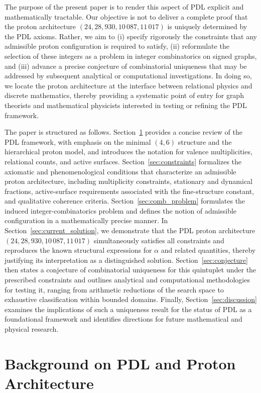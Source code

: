 \documentclass[11pt,a4paper]{article}
\begin{document}
The purpose of the present paper is to render this aspect of PDL explicit and mathematically tractable. Our objective is not to deliver a complete proof that the proton architecture $(24,28,930,10\,087,11\,017)$ is uniquely determined by the PDL axioms. Rather, we aim to (i) specify rigorously the constraints that any admissible proton configuration is required to satisfy, (ii) reformulate the selection of these integers as a problem in integer combinatorics on signed graphs, and (iii) advance a precise conjecture of combinatorial uniqueness that may be addressed by subsequent analytical or computational investigations. In doing so, we locate the proton architecture at the interface between relational physics and discrete mathematics, thereby providing a systematic point of entry for graph theorists and mathematical physicists interested in testing or refining the PDL framework. 

The paper is structured as follows. Section~\ref{sec:background} provides a concise review of the PDL framework, with emphasis on the minimal $(4,6)$ structure and the hierarchical proton model, and introduces the notation for valence multiplicities, relational counts, and active surfaces. Section~\ref{sec:constraints} formalizes the axiomatic and phenomenological conditions that characterize an admissible proton architecture, including multiplicity constraints, stationary and dynamical fractions, active-surface requirements associated with the fine-structure constant, and qualitative coherence criteria. Section~\ref{sec:comb_problem} formulates the induced integer-combinatorics problem and defines the notion of admissible configuration in a mathematically precise manner. In Section~\ref{sec:current_solution}, we demonstrate that the PDL proton architecture $(24,28,930,10\,087,11\,017)$ simultaneously satisfies all constraints and reproduces the known structural expressions for $\alpha$ and related quantities, thereby justifying its interpretation as a distinguished solution. Section~\ref{sec:conjecture} then states a conjecture of combinatorial uniqueness for this quintuplet under the prescribed constraints and outlines analytical and computational methodologies for testing it, ranging from arithmetic reductions of the search space to exhaustive classification within bounded domains. Finally, Section~\ref{sec:discussion} examines the implications of such a uniqueness result for the status of PDL as a foundational framework and identifies directions for future mathematical and physical research.

\section{Background on PDL and Proton Architecture}
\label{sec:background}
\end{document}
